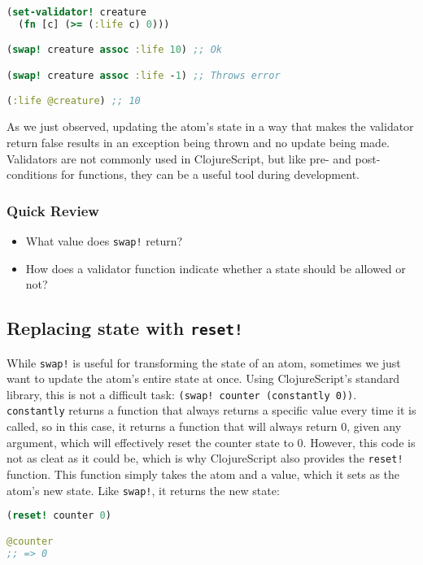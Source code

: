 \documentclass[10pt,twoside,openright]{memoir}
\begin{document}
\begin{lstlisting}[language=Clojure]
(set-validator! creature
  (fn [c] (>= (:life c) 0)))

(swap! creature assoc :life 10) ;; Ok

(swap! creature assoc :life -1) ;; Throws error

(:life @creature) ;; 10
\end{lstlisting}

As we just observed, updating the atom's state in a way that makes the
validator return false results in an exception being thrown and no
update being made. Validators are not commonly used in ClojureScript,
but like pre- and post-conditions for functions, they can be a useful
tool during development.


\subsubsection{Quick Review}

\begin{itemize}
\tightlist
\item
  What value does \texttt{swap!} return?
\item
  How does a validator function indicate whether a state should be
  allowed or not?
\end{itemize}


\subsection{Replacing state with \texttt{reset!}}

While \texttt{swap!} is useful for transforming the state of an atom,
sometimes we just want to update the atom's entire state at once. Using
ClojureScript's standard library, this is not a difficult task:
\texttt{(swap!\ counter\ (constantly\ 0))}. \texttt{constantly} returns
a function that always returns a specific value every time it is called,
so in this case, it returns a function that will always return 0, given
any argument, which will effectively reset the counter state to 0.
However, this code is not as cleat as it could be, which is why
ClojureScript also provides the \texttt{reset!} function. This function
simply takes the atom and a value, which it sets as the atom's new
state. Like \texttt{swap!}, it returns the new state:

\begin{lstlisting}[language=Clojure]
(reset! counter 0)

@counter
;; => 0
\end{lstlisting}
\end{document}
